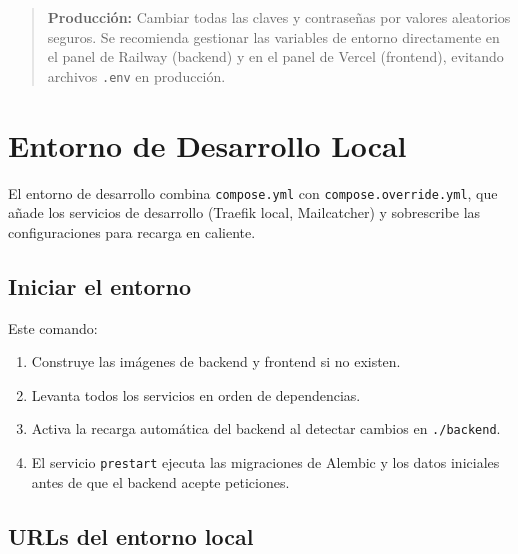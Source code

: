 \begin{quote}
\textbf{Producción:} Cambiar todas las claves y contraseñas por valores aleatorios seguros. Se recomienda gestionar las variables de entorno directamente en el panel de Railway (backend) y en el panel de Vercel (frontend), evitando archivos \texttt{.env} en producción.
\end{quote}

\section{Entorno de Desarrollo Local}\label{entorno-de-desarrollo-local}

El entorno de desarrollo combina \texttt{compose.yml} con \texttt{compose.override.yml}, que añade los servicios de desarrollo (Traefik local, Mailcatcher) y sobrescribe las configuraciones para recarga en caliente.

\subsection{Iniciar el entorno}\label{iniciar-el-entorno}

\begin{Shaded}
\begin{Highlighting}[]
\end{Highlighting}
\end{Shaded}

Este comando:

\begin{enumerate}
\def\labelenumi{\arabic{enumi}.}
\tightlist
\item
  Construye las imágenes de backend y frontend si no existen.
\item
  Levanta todos los servicios en orden de dependencias.
\item
  Activa la recarga automática del backend al detectar cambios en \texttt{./backend}.
\item
  El servicio \texttt{prestart} ejecuta las migraciones de Alembic y los datos iniciales antes de que el backend acepte peticiones.
\end{enumerate}

\subsection{URLs del entorno local}\label{urls-del-entorno-local}

